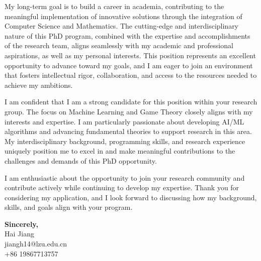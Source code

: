 \documentclass{ExpressiveCoverLetter}
\begin{document}
{%
My long-term goal is to build a career in academia, 
contributing to the meaningful implementation of innovative solutions through 
the integration of Computer Science and Mathematics. 
The cutting-edge and interdisciplinary nature of this PhD program, 
combined with the expertise and accomplishments of the research team, 
aligns seamlessly with my academic and professional aspirations, as well as my personal interests. 
This position represents an excellent opportunity to advance toward my goals, 
and I am eager to join an environment that fosters intellectual rigor, collaboration, 
and access to the resources needed to achieve my ambitions.

I am confident that I am a strong candidate for this position within your research group. 
The focus on Machine Learning and Game Theory closely aligns with my interests and expertise. 
I am particularly passionate about developing AI/ML algorithms and advancing fundamental theories 
to support research in this area. 
My interdisciplinary background, programming skills, and research experience uniquely position me 
to excel in and make meaningful contributions to the challenges and demands of this PhD opportunity.

I am enthusiastic about the opportunity to join your research community 
and contribute actively while continuing to develop my expertise. 
Thank you for considering my application, 
and I look forward to discussing how my background, skills, and goals align with your program.
}


\textbf{Sincerely,}\\
Hai Jiang \\
\email jiangh14@lzu.edu.cn\\
\phone +86 19867713757\\
\end{document}
